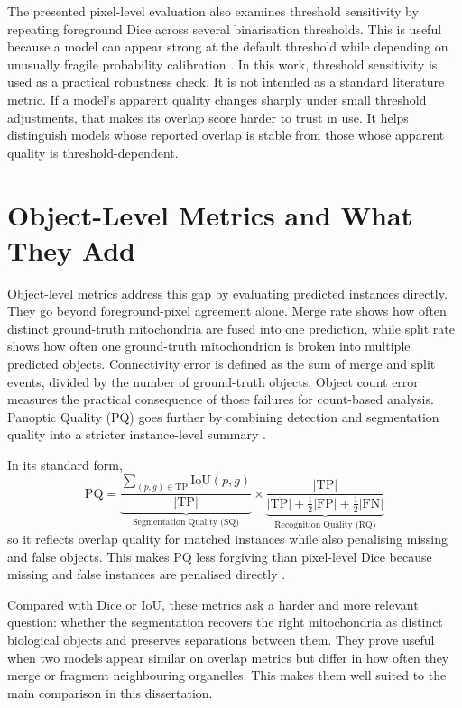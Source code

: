 \documentclass[logo,bsc,singlespacing,parskip,online]{infthesis}
\begin{document}
The presented pixel-level evaluation also examines threshold sensitivity by repeating foreground
Dice across several binarisation thresholds. This is useful because a model can
appear strong at the default threshold while depending on unusually fragile
probability calibration \citep{guo2017calibration}. In this work, threshold sensitivity is
used as a practical robustness check. It is not intended as a standard literature metric. If a
model's apparent quality changes sharply under small threshold adjustments, that
makes its overlap score harder to trust in use. It helps distinguish models whose reported
overlap is stable from those whose apparent quality is threshold-dependent.

\section{Object-Level Metrics and What They Add}

Object-level metrics address this gap by evaluating predicted instances
directly. They go beyond foreground-pixel agreement alone. Merge rate shows
how often distinct ground-truth mitochondria are fused into one prediction,
while split rate shows how often one ground-truth mitochondrion is broken into
multiple predicted objects. Connectivity error is defined as the sum of
merge and split events, divided by the number of ground-truth objects. Object
count error measures the practical consequence of those failures for
count-based analysis. Panoptic Quality (PQ) goes further by combining detection
and segmentation quality into a stricter instance-level summary
\citep{kirillov2019panoptic}.

In its standard form,
\[
\text{PQ} =
\underbrace{
\frac{\sum_{(p,g) \in \mathrm{TP}} \mathrm{IoU}(p,g)}{|\mathrm{TP}|}
}_{\text{Segmentation Quality (SQ)}}
\times
\underbrace{
\frac{|\mathrm{TP}|}{|\mathrm{TP}| + \frac{1}{2}|\mathrm{FP}| + \frac{1}{2}|\mathrm{FN}|}
}_{\text{Recognition Quality (RQ)}}
\]
so it reflects overlap quality for matched instances while also penalising
missing and false objects. This makes PQ less forgiving than
pixel-level Dice because missing and false instances are penalised directly
\citep{kirillov2019panoptic}.

Compared with Dice or IoU, these metrics ask a harder and more relevant
question: whether the segmentation recovers the right mitochondria as distinct
biological objects and preserves separations between them. 
They prove useful when two models appear similar on
overlap metrics but differ in how often they merge or fragment neighbouring
organelles. This makes them well suited to the main comparison in this
dissertation.
\end{document}
